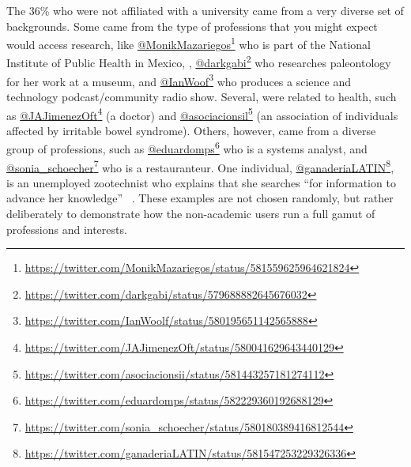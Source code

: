 The 36\% who were not affiliated with a university came from a very diverse set of backgrounds. Some came from the type of professions that you might expect would access research, like \href{https://twitter.com/MonikMazariegos/status/581559625964621824}{@MonikMazariegos}\footnote{\href{https://twitter.com/MonikMazariegos/status/581559625964621824}{https:/\slash twitter.com\slash MonikMazariegos\slash status\slash 581559625964621824}} who is part of the National Institute of Public Health in Mexico, , \href{https://twitter.com/darkgabi/status/579688882645676032}{@darkgabi}\footnote{\href{https://twitter.com/darkgabi/status/579688882645676032}{https:/\slash twitter.com\slash darkgabi\slash status\slash 579688882645676032}} who researches paleontology for her work at a museum, and \href{https://twitter.com/IanWoolf/status/580195651142565888}{@IanWoof}\footnote{\href{https://twitter.com/IanWoolf/status/580195651142565888}{https:/\slash twitter.com\slash IanWoolf\slash status\slash 580195651142565888}} who produces a science and technology podcast\slash community radio show. Several, were related to health, such as \href{https://twitter.com/JAJimenezOft/status/580041629643440129}{@JAJimenezOft}\footnote{\href{https://twitter.com/JAJimenezOft/status/580041629643440129}{https:/\slash twitter.com\slash JAJimenezOft\slash status\slash 580041629643440129}} (a doctor) and \href{https://twitter.com/asociacionsii/status/581443257181274112}{@asociacionsil}\footnote{\href{https://twitter.com/asociacionsii/status/581443257181274112}{https:/\slash twitter.com\slash asociacionsii\slash status\slash 581443257181274112}} (an association of individuals affected by irritable bowel syndrome). Others, however, came from a diverse group of professions, such as \href{https://twitter.com/eduardomps/status/582229360192688129}{@eduardomps}\footnote{\href{https://twitter.com/eduardomps/status/582229360192688129}{https:/\slash twitter.com\slash eduardomps\slash status\slash 582229360192688129}} who is a systems analyst, and \href{https://twitter.com/sonia_schoecher/status/580180389416812544}{@sonia\_schoecher}\footnote{\href{https://twitter.com/sonia\_schoecher/status/580180389416812544}{https:/\slash twitter.com\slash sonia\_schoecher\slash status\slash 580180389416812544}} who is a restauranteur. One individual, \href{https://twitter.com/ganaderiaLATIN/status/581547253229326336}{@ganaderiaLATIN}\footnote{\href{https://twitter.com/ganaderiaLATIN/status/581547253229326336}{https:/\slash twitter.com\slash ganaderiaLATIN\slash status\slash 581547253229326336}}, is an unemployed zootechnist who explains that she searches ``for information to advance her knowledge'' ~\citep[own translation]{ganaderiaLATIN2015}. These examples are not chosen randomly, but rather deliberately to demonstrate how the non-academic users run a full gamut of professions and interests.



